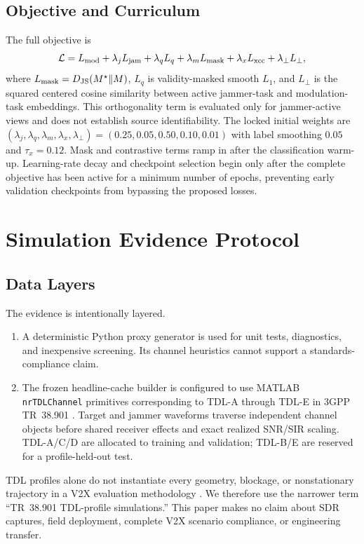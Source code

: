 \documentclass[letterpaper,journal]{IEEEtran}
\newcommand{\JS}{D_{\mathrm{JS}}}
\begin{document}
\subsection{Objective and Curriculum}
The full objective is
\begin{equation}
\mathcal{L}=L_{\rm mod}
+\lambda_jL_{\rm jam}
+\lambda_qL_q
+\lambda_mL_{\rm mask}
+\lambda_xL_{\rm xcc}
+\lambda_\perp L_\perp,
\label{eq:loss}
\end{equation}
where $L_{\rm mask}=\JS(M^\star\|M)$, $L_q$ is validity-masked smooth
$L_1$, and $L_\perp$ is the squared centered cosine similarity between active
jammer-task and modulation-task embeddings.  This orthogonality term is
evaluated only for jammer-active views and does not establish source
identifiability.  The locked initial weights are
$(\lambda_j,\lambda_q,\lambda_m,\lambda_x,\lambda_\perp)=
(0.25,0.05,0.50,0.10,0.01)$ with label smoothing $0.05$ and
$\tau_x=0.12$.  Mask and contrastive terms ramp in after the classification
warm-up. Learning-rate decay and checkpoint selection begin only after the
complete objective has been active for a minimum number of epochs, preventing
early validation checkpoints from bypassing the proposed losses.

\section{Simulation Evidence Protocol}
\subsection{Data Layers}
The evidence is intentionally layered.
\begin{enumerate}
  \item A deterministic Python proxy generator is used for unit tests,
  diagnostics, and inexpensive screening.  Its channel heuristics cannot
  support a standards-compliance claim.
  \item The frozen headline-cache builder is configured to use MATLAB
  \texttt{nrTDLChannel} primitives corresponding to TDL-A through TDL-E in
  3GPP TR~38.901
  \cite{3gpp38901}. Target and jammer waveforms traverse independent channel
  objects before shared receiver effects and exact realized SNR/SIR scaling.
  TDL-A/C/D are allocated to training and validation; TDL-B/E are reserved for
  a profile-held-out test.
\end{enumerate}
TDL profiles alone do not instantiate every geometry, blockage, or nonstationary
trajectory in a V2X evaluation methodology \cite{3gpp37885}.  We therefore use
the narrower term ``TR~38.901 TDL-profile simulations.''  This paper makes no
claim about SDR captures, field deployment, complete V2X scenario compliance,
or engineering transfer.
\end{document}

